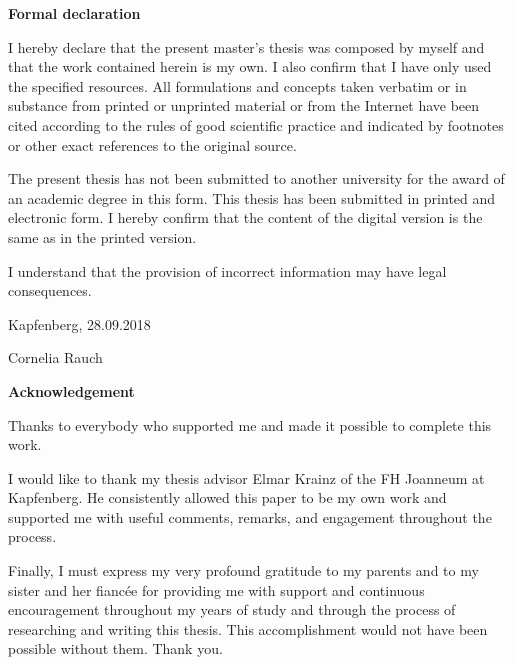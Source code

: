 \chapterend

\begin{titlepage}


\begin{center}\large\bf
Formal declaration
\end{center}


I hereby declare that the present master's thesis was composed by myself and that the work contained herein is my own. I also confirm that I have only used the specified resources. All formulations and concepts taken verbatim or in substance from printed or unprinted material or from the Internet have been cited according to the rules of good scientific practice and indicated by footnotes or other exact references to the original source. 

The present thesis has not been submitted to another university for the award of an academic degree in this form. This thesis has been submitted in printed and electronic form. I hereby confirm that the content of the digital version is the same as in the printed version.

I understand that the provision of incorrect information may have legal consequences.

\vspace{1,5cm}
Kapfenberg, 28.09.2018

\flushright
\vspace{15mm}
Cornelia Rauch

\end{titlepage}



\chapterend

\begin{titlepage}

\begin{center}\large\bf
Acknowledgement
\end{center}
Thanks to everybody who supported me and made it possible to complete this work.

I would like to thank my thesis advisor Elmar Krainz of the FH Joanneum at Kapfenberg. He consistently allowed this paper to be my own work and supported me with useful comments, remarks, and engagement throughout the process. 

Finally, I must express my very profound gratitude to my parents and to my sister and her fiancée for providing me with support and continuous encouragement throughout my years of study and through the process of researching and writing this thesis. This accomplishment would not have been possible without them. Thank you.

\end{titlepage}



\chapterend
